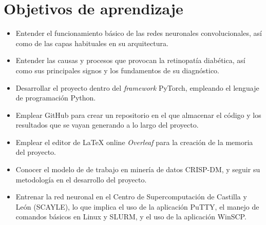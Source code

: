 \section{Objetivos de aprendizaje}
\begin{itemize}[itemsep=0.25em]
    \item Entender el funcionamiento básico de las redes neuronales convolucionales, así como de las capas habituales en su arquitectura.
    \item Entender las causas y procesos que provocan la retinopatía diabética, así como sus principales signos y los fundamentos de su diagnóstico.
    \item Desarrollar el proyecto dentro del \textit{framework} PyTorch, empleando el lenguaje de programación Python.
    \item Emplear GitHub para crear un repositorio en el que almacenar el código y los resultados que se vayan generando a lo largo del proyecto.
    \item Emplear el editor de LaTeX online \textit{Overleaf} para la creación de la memoria del proyecto.
    \item Conocer el modelo de de trabajo en minería de datos CRISP-DM, y seguir su metodología en el desarrollo del proyecto.
    \item Entrenar la red neuronal en el Centro de Supercomputación de Castilla y León (SCAYLE), lo que implica el uso de la aplicación PuTTY, el manejo de comandos básicos en Linux y SLURM, y el uso de la aplicación WinSCP.
\end{itemize}